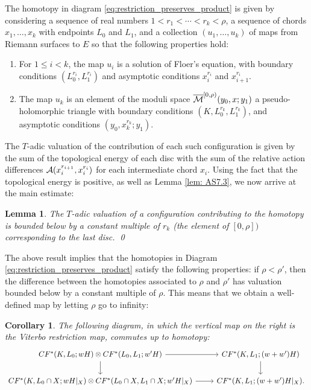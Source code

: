 \documentclass{article}
\theoremstyle{plain}%
\newtheorem{lem}[thm]{Lemma}
\newtheorem{cor}[thm]{Corollary}
\theoremstyle{definition}
\numberwithin{equation}{section}
\numberwithin{figure}{section}
\def\cA{{\mathbin{\cal A}}}
\def\cM{{\mathbin{\cal M}}}
\def\Mbar{\overline{\cM}}
\begin{document}
The homotopy in diagram \eqref{eq:restriction_preserves_product} is given by considering a sequence of real numbers $1 < r_1 < \cdots < r_k < \rho$, a sequence of chords $x_1, \ldots, x_k$ with endpoints $L_0$ and $L_1$, and a collection $(u_1, \ldots, u_k)$ of maps from Riemann surfaces to $E$ so that the following properties hold:
\begin{enumerate}
  \item For $1 \leq i < k$, the map $u_i$ is a solution of Floer's equation, with boundary conditions $(L^{r_i}_0, L^{r_i}_1)$ and asymptotic conditions $x_i^{r_i}$ and $x_{i+1}^{r_i}$.  
  \item The map $u_k$ is an element of the moduli space $ \Mbar^{[0,\rho)}(y_0, x; y_1)$ a pseudo-holomorphic triangle with boundary conditions $(K, L^{r_k}_0,  L^{r_k}_1)$, and asymptotic conditions $(y_0, x_k^{r_k}; y_1)$.
  \end{enumerate}
  The $T$-adic valuation of the contribution of each such configuration is given by the sum of the topological energy of each disc with the sum of the relative action differences $\cA(x_i^{r_{i+1}},x_i^{r_{i}}) $  for each intermediate chord $x_i$. Using the fact that the topological energy is positive, as well as Lemma \ref{lem: AS7.3}, we now arrive at the main estimate:
  \begin{lem}
    The $T$-adic valuation of a configuration contributing to the homotopy is bounded below by a constant multiple of $r_k$ (the element of $[0,\rho])$ corresponding to the last disc. \qed
  \end{lem}
    The above result implies that the homotopies in Diagram \eqref{eq:restriction_preserves_product} satisfy the following properties: if $\rho < \rho'$, then the difference between the homotopies associated to $\rho$ and $\rho'$ has valuation bounded below by a constant multiple of $\rho$. This means that we obtain a well-defined map by letting $\rho$ go to infinity:
  \begin{cor}
    The following diagram, in which the vertical map on the right is the Viterbo restriction map, commutes up to homotopy:
\begin{equation} 
  \begin{tikzcd}
    CF^*(K, L_0; w H) \otimes  CF^*(L_0,L_1; w' H)  \ar[r] \ar[d] &  CF^*(K, L_1; (w+w') H)  \ar[d]  \\
    CF^*(K, L_0 \cap X ; w H|_{X}) \otimes  CF^*(L_0 \cap X ,L_1 \cap X; w' H|_{X})  \ar[r] &  CF^*(K, L_1; (w+w') H|_{X}).
  \end{tikzcd}
\end{equation}    
  \end{cor}
\end{document}
